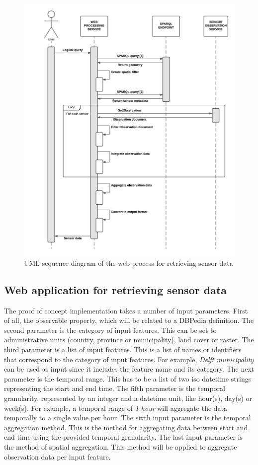 \begin{figure}
	\centering
	\includegraphics[width=\linewidth]{UML/RetrieveSensorData.png}
	\caption{UML sequence diagram of the web process for retrieving sensor data}
	\label{fig:Sequence2}
\end{figure}

\subsection{Web application for retrieving sensor data}
\label{par:webApp}
The proof of concept implementation takes a number of input parameters. First of all, the observable property, which will be related to a DBPedia definition. The second parameter is the category of input features. This can be set to administrative units (country, province or municipality), land cover or raster. The third parameter is a list of input features. This is a list of names or identifiers that correspond to the category of input features. For example, \textit{Delft municipality} can be used as input since it includes the feature name and its category. The next parameter is the temporal range. This has to be a list of two \ac{iso} datetime strings representing the start and end time. The fifth parameter is the temporal granularity, represented by an integer and a datetime unit, like hour(s), day(s) or week(s). For example, a temporal range of \textit{1 hour} will aggregate the data temporally to a single value per hour. The sixth input parameter is the temporal aggregation method. This is the method for aggregating data between start and end time using the provided temporal granularity. The last input parameter is the method of spatial aggregation. This method will be applied to aggregate observation data per input feature.       

